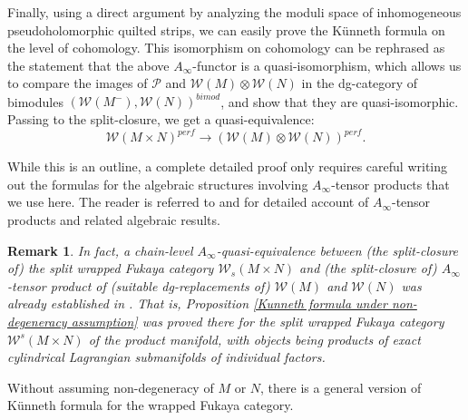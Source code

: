 \documentclass{amsart}
\newtheorem{remark}[theorem]{Remark}
\numberwithin{equation}{section}
\numberwithin{figure}{section}
\begin{document}
Finally, using a direct argument by analyzing the moduli space of inhomogeneous pseudoholomorphic quilted strips, we can easily prove the K\"{u}nneth formula on the level of cohomology.
This isomorphism on cohomology can be rephrased as the statement that the above $A_{\infty}$-functor is a quasi-isomorphism, which allows us to compare the images of $\mathcal{P}$ and $\mathcal{W}(M) \otimes \mathcal{W}(N)$ in the dg-category of bimodules $(\mathcal{W}(M^{-}), \mathcal{W}(N))^{bimod}$, and show that they are quasi-isomorphic.
Passing to the split-closure, we get a quasi-equivalence:
\begin{equation}
\mathcal{W}(M \times N)^{perf} \to (\mathcal{W}(M) \otimes \mathcal{W}(N))^{perf}.
\end{equation} \par
	While this is an outline, a complete detailed proof only requires careful writing out the formulas for the algebraic structures involving $A_{\infty}$-tensor products that we use here. The reader is referred to \cite{Saneblidze-Umble} and \cite{Markl-Shnider} for detailed account of $A_{\infty}$-tensor products and related algebraic results. \par

\begin{remark}
	In fact, a chain-level $A_{\infty}$-quasi-equivalence between (the split-closure of) the split wrapped Fukaya category $\mathcal{W}_{s}(M \times N)$ and (the split-closure of) $A_{\infty}$-tensor product of (suitable dg-replacements of) $\mathcal{W}(M)$ and $\mathcal{W}(N)$ was already established in \cite{Ganatra}. That is, Proposition \ref{Kunneth formula under non-degeneracy assumption} was proved there for the split wrapped Fukaya category $\mathcal{W}^{s}(M \times N)$ of the product manifold, with objects being products of exact cylindrical Lagrangian submanifolds of individual factors.
\end{remark}

	Without assuming non-degeneracy of $M$ or $N$, there is a general version of K\"{u}nneth formula for the wrapped Fukaya category. \par
\end{document}
